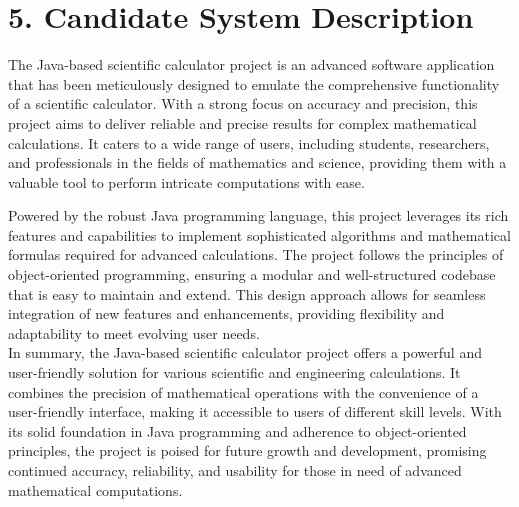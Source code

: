 \documentclass[letterpaper, 11pt]{report}
\begin{document}
\section*{5. Candidate System Description}
\normalsize {The Java-based scientific calculator project is an advanced software application that has been meticulously designed to emulate the comprehensive functionality of a scientific calculator. With a strong focus on accuracy and precision, this project aims to deliver reliable and precise results for complex mathematical calculations. It caters to a wide range of users, including students, researchers, and professionals in the fields of mathematics and science, providing them with a valuable tool to perform intricate computations with ease.

Powered by the robust Java programming language, this project leverages its rich features and capabilities to implement sophisticated algorithms and mathematical formulas required for advanced calculations. The project follows the principles of object-oriented programming, ensuring a modular and well-structured codebase that is easy to maintain and extend. This design approach allows for seamless integration of new features and enhancements, providing flexibility and adaptability to meet evolving user needs.
\\

In summary, the Java-based scientific calculator project offers a powerful and user-friendly solution for various scientific and engineering calculations. It combines the precision of mathematical operations with the convenience of a user-friendly interface, making it accessible to users of different skill levels. With its solid foundation in Java programming and adherence to object-oriented principles, the project is poised for future growth and development, promising continued accuracy, reliability, and usability for those in need of advanced mathematical computations.}\\

\end{document}
